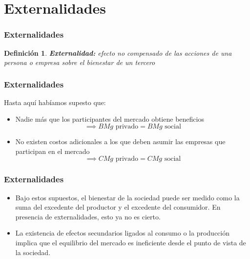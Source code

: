 \documentclass[dvipsnames,table,leqno]{beamer}
\newtheorem{mydef}{Definición}
\begin{document}
	\section{Externalidades}
	
		\begin{frame}
			\frametitle{Externalidades}
			\begin{mydef}
				\textbf{Externalidad:} efecto no compensado de las acciones de una persona o empresa sobre el bienestar de un tercero
			\end{mydef}
		\end{frame}

		\begin{frame}
			\frametitle{Externalidades}
			Hasta aquí habíamos supesto que:
				\begin{itemize}
					\item Nadie más que los participantes del mercado obtiene beneficios $$\implies BMg \text{ privado} = BMg \text{ social}$$
					\item No existen costos adicionales a los que deben asumir las empresas que participan en el mercado $$\implies CMg \text{ privado} = CMg \text{ social}$$
				\end{itemize}
		\end{frame}

		\begin{frame}
			\frametitle{Externalidades}
				\begin{itemize}
					\item Bajo estos supuestos, el bienestar de la sociedad puede ser medido como la suma del excedente del productor y el excedente del consumidor. En presencia de externalidades, esto ya no es cierto.
					\item La existencia de efectos secundarios ligados al consumo o la producción implica que el equilibrio del mercado es ineficiente desde el punto de vista de la sociedad.
				\end{itemize}
		\end{frame}
\end{document}
